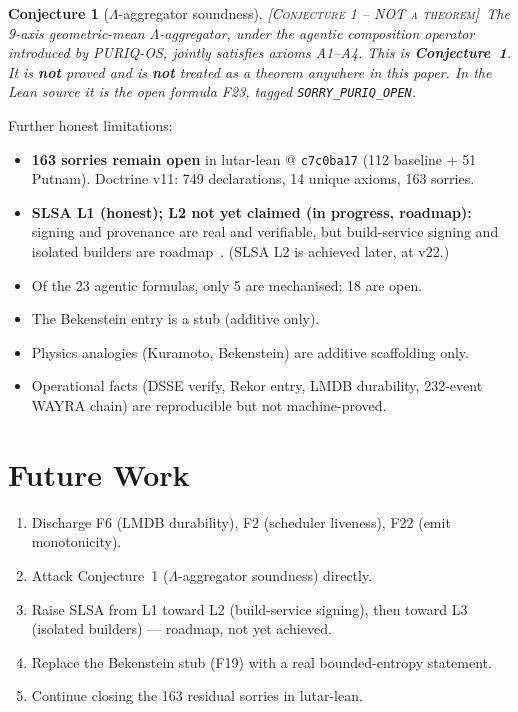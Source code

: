 \documentclass[11pt]{article}
\theoremstyle{plain}
\newtheorem{conjecture}{Conjecture}
\theoremstyle{definition}
\theoremstyle{remark}
\newcommand{\statusConj}{\textcolor{red!70!black}{\textsc{[Conjecture 1 -- NOT a theorem]}}}
\newcommand{\La}{\Lambda}
\begin{document}
\begin{conjecture}[$\La$-aggregator soundness]\statusConj\ The 9-axis geometric-mean
$\La$-aggregator, under the agentic composition operator introduced by PURIQ-OS, jointly
satisfies axioms A1--A4. This is \textbf{Conjecture~1}. It is \textbf{not} proved and is
\textbf{not} treated as a theorem anywhere in this paper. In the Lean source it is the
open formula F23, tagged \texttt{SORRY\_PURIQ\_OPEN}.
\end{conjecture}

Further honest limitations:
\begin{itemize}[leftmargin=1.4em]
\item \textbf{163 sorries remain open} in lutar-lean @ \texttt{c7c0ba17} (112 baseline +
51 Putnam). Doctrine v11: 749 declarations, 14 unique axioms, 163 sorries.
\item \textbf{SLSA L1 (honest); L2 not yet claimed (in progress, roadmap):} signing and
provenance are real and verifiable, but build-service signing and isolated builders are
roadmap~\cite{slsa}. (SLSA L2 is achieved later, at v22.)
\item Of the 23 agentic formulas, only 5 are mechanised; 18 are open.
\item The Bekenstein entry is a stub (additive only).
\item Physics analogies (Kuramoto, Bekenstein) are additive scaffolding only.
\item Operational facts (DSSE verify, Rekor entry, LMDB durability, 232-event WAYRA
chain) are reproducible but not machine-proved.
\end{itemize}

\section{Future Work}
\label{sec:future}
\begin{enumerate}[leftmargin=1.4em]
\item Discharge F6 (LMDB durability), F2 (scheduler liveness), F22 (emit monotonicity).
\item Attack Conjecture~1 ($\La$-aggregator soundness) directly.
\item Raise SLSA from L1 toward L2 (build-service signing), then toward L3 (isolated
builders) --- roadmap, not yet achieved.
\item Replace the Bekenstein stub (F19) with a real bounded-entropy statement.
\item Continue closing the 163 residual sorries in lutar-lean.
\end{enumerate}
\end{document}
